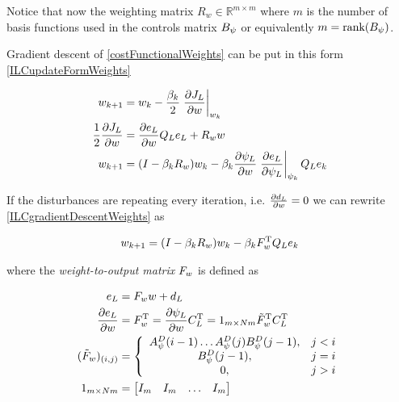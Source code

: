 Notice that now the weighting matrix $R_w \in \mathbb{R}^{m \times m}$ where $m$ is the number of basis functions used in the controls matrix $B_{\psi}$ or equivalently $m = \text{rank}(B_{\psi})$.

Gradient descent of \eqref{costFunctionalWeights} can be put in this form \eqref{ILCupdateFormWeights}

\begin{equation}
\begin{aligned}
w_{k+1} &= w_k - \frac{\beta_k}{2} \left.\frac{\partial{J_L}}{\partial{w}}\right|_{w_k} \\
\frac{1}{2}\frac{\partial{J_L}}{\partial{w}} &= \frac{\partial{e_L}}{\partial{w}}Q_Le_L + R_{w}w \\
w_{k+1} &= (I - \beta_kR_{w})w_k - \beta_k\frac{\partial{\psi_L}}{\partial{w}}\left.\frac{\partial{e_L}}{\partial{\psi_L}}\right|_{\psi_k}Q_Le_k
\end{aligned}
\label{ILCgradientDescentWeights}
\end{equation}

If the disturbances are repeating every iteration, i.e. $\frac{\partial{d_L}}{\partial{w}} = 0$ we can rewrite \eqref{ILCgradientDescentWeights} as

\begin{equation}
\begin{aligned}
w_{k+1} = (I - \beta_kR_{w})w_k - \beta_kF_{w}^\mathrm{T}Q_Le_k
\end{aligned}
\label{ILCgradientDescentWeights2}
\end{equation}

where the \emph{weight-to-output matrix} $F_{w}$ is defined as

\begin{equation}
\begin{aligned}
e_L &= F_{w}w + d_L \\
\frac{\partial{e_L}}{\partial{w}} &= F_{w}^{\mathrm{T}} = \frac{\partial{\psi_L}}{\partial{w}}C_L^{\mathrm{T}} = 1_{m\times Nm}\tilde{F}_{w}^{\mathrm{T}}C_L^{\mathrm{T}} \\
(\tilde{F}_{w})_{(i,j)} &= \left \{
\begin{array}{cc}
A^{D}_{\psi}(i-1)\ldots A^{D}_{\psi}(j)B^{D}_{\psi}(j-1), & j < i \\ 
B^{D}_{\psi}(j-1), & j = i \\
0, & j > i 
\end{array} \right. \\
1_{m\times Nm} &= \begin{bmatrix}
  I_{m} & I_{m} & \ldots & I_{m}
 \end{bmatrix}
\end{aligned}
\label{weightToOutputMatrix}
\end{equation}


